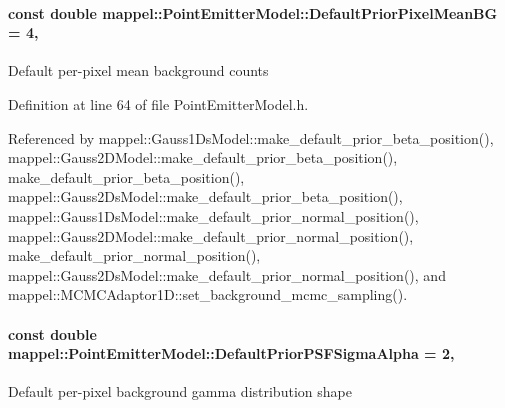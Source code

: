 \paragraph[{\texorpdfstring{Default\+Prior\+Pixel\+Mean\+BG}{DefaultPriorPixelMeanBG}}]{\setlength{\rightskip}{0pt plus 5cm}const double mappel\+::\+Point\+Emitter\+Model\+::\+Default\+Prior\+Pixel\+Mean\+BG = 4\hspace{0.3cm}{\ttfamily [static]}, {\ttfamily [inherited]}}\hypertarget{classmappel_1_1PointEmitterModel_a72efb3ee01fa548683d510288266fea5}{}\label{classmappel_1_1PointEmitterModel_a72efb3ee01fa548683d510288266fea5}
Default per-\/pixel mean background counts 

Definition at line 64 of file Point\+Emitter\+Model.\+h.



Referenced by mappel\+::\+Gauss1\+Ds\+Model\+::make\+\_\+default\+\_\+prior\+\_\+beta\+\_\+position(), mappel\+::\+Gauss2\+D\+Model\+::make\+\_\+default\+\_\+prior\+\_\+beta\+\_\+position(), make\+\_\+default\+\_\+prior\+\_\+beta\+\_\+position(), mappel\+::\+Gauss2\+Ds\+Model\+::make\+\_\+default\+\_\+prior\+\_\+beta\+\_\+position(), mappel\+::\+Gauss1\+Ds\+Model\+::make\+\_\+default\+\_\+prior\+\_\+normal\+\_\+position(), mappel\+::\+Gauss2\+D\+Model\+::make\+\_\+default\+\_\+prior\+\_\+normal\+\_\+position(), make\+\_\+default\+\_\+prior\+\_\+normal\+\_\+position(), mappel\+::\+Gauss2\+Ds\+Model\+::make\+\_\+default\+\_\+prior\+\_\+normal\+\_\+position(), and mappel\+::\+M\+C\+M\+C\+Adaptor1\+D\+::set\+\_\+background\+\_\+mcmc\+\_\+sampling().

\paragraph[{\texorpdfstring{Default\+Prior\+P\+S\+F\+Sigma\+Alpha}{DefaultPriorPSFSigmaAlpha}}]{\setlength{\rightskip}{0pt plus 5cm}const double mappel\+::\+Point\+Emitter\+Model\+::\+Default\+Prior\+P\+S\+F\+Sigma\+Alpha = 2\hspace{0.3cm}{\ttfamily [static]}, {\ttfamily [inherited]}}\hypertarget{classmappel_1_1PointEmitterModel_a2b06111eaa1ff284851c2e67a3827220}{}\label{classmappel_1_1PointEmitterModel_a2b06111eaa1ff284851c2e67a3827220}
Default per-\/pixel background gamma distribution shape 

